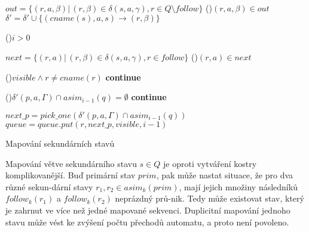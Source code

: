 \begin{algorithm}[h]
{{                    $out = \{(r, a, \beta) |\, (r, \beta) \in \delta(s, a, \gamma), r \in Q \setminus follow\}$\;
                    \ForAll(){$(r, a, \beta) \in out$}
                    {
                        $\delta' = \delta' \cup \{(cname(s), a, s) \rightarrow (r, \beta)\}$\;
                    }
                }

                \vspace{0.2cm}

                \If(){$i > 0$}
                {
                    $next = \{(r, a) |\, (r, \beta) \in \delta(s, a, \gamma), r \in follow\}$\;
                    \ForAll(){$(r, a) \in next$}
                    {
                        \If(){$visible \land r \neq cname(r)$}
                        {
                            \textbf{continue}\;
                        }

                        \If(){$\delta'(p, a, \Gamma) \cap asim_{i-1}(q) = \emptyset$}
                        {
                            \textbf{continue}\;
                        }

                        $next\_p = pick\_one(\delta'(p, a, \Gamma) \cap asim_{i-1}(q))$\;
                        $queue = queue.put(r, next\_p, visible, i-1)$\;

                    }
                }

            }

            \normalsize
            \caption{Mapování sekundárních stavů}
            \label{mapSec-Alg}
        \end{algorithm}

        Mapování větve sekundárního stavu $s \in Q$ je oproti vytváření kostry komplikovanější. Buď primární stav $prim$, pak může nastat situace, že pro dva různé sekun-dární stavy $r_1, r_2 \in asim_k(prim)$, mají jejich množiny následníků $follow_k(r_1)$ a $follow_k(r_2)$ neprázdný prů-nik. Tedy může existovat stav, který je zahrnut ve více než jedné mapované sekvenci. Duplicitní mapování jednoho stavu může vést ke zvýšení počtu přechodů automatu, a proto není povoleno.


